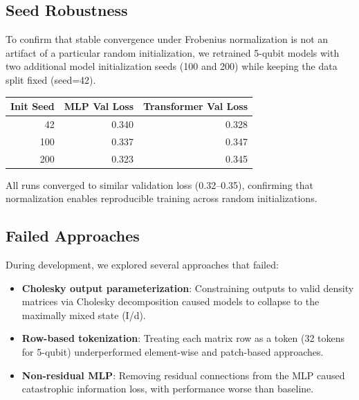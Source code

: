 \documentclass[11pt]{article}
\begin{document}
\subsection{Seed Robustness}
\label{sec:orgf419b3b}
To confirm that stable convergence under Frobenius normalization is not an artifact of a particular random initialization, we retrained 5-qubit models with two additional model initialization seeds (100 and 200) while keeping the data split fixed (seed=42).

\begin{center}
\begin{tabular}{rrr}
Init Seed & MLP Val Loss & Transformer Val Loss\\
\hline
42 & 0.340 & 0.328\\
100 & 0.337 & 0.347\\
200 & 0.323 & 0.345\\
\end{tabular}
\end{center}

All runs converged to similar validation loss (0.32--0.35), confirming that normalization enables reproducible training across random initializations.
\subsection{Failed Approaches}
\label{sec:orgc11d74b}

During development, we explored several approaches that failed:

\begin{itemize}
\item \textbf{Cholesky output parameterization}: Constraining outputs to valid density matrices via Cholesky decomposition caused models to collapse to the maximally mixed state (I/d).
\item \textbf{Row-based tokenization}: Treating each matrix row as a token (32 tokens for 5-qubit) underperformed element-wise and patch-based approaches.
\item \textbf{Non-residual MLP}: Removing residual connections from the MLP caused catastrophic information loss, with performance worse than baseline.
\end{itemize}
\printbibliography
\end{document}
